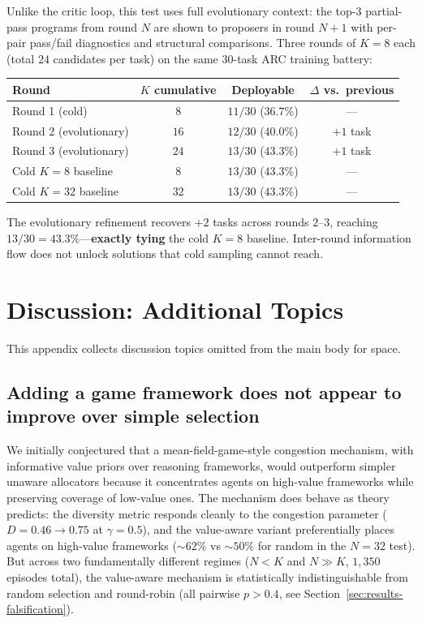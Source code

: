 \documentclass[11pt]{amsart}
\newcommand{\g}{\gamma}
\newcommand\1{{\mathds{1}}}
\theoremstyle{definition}
\theoremstyle{remark}
\numberwithin{equation}{section}
\begin{document}
Unlike the critic loop, this test uses full evolutionary context: the top-$3$ partial-pass programs from round $N$ are shown to proposers in round $N{+}1$ with per-pair pass/fail diagnostics and structural comparisons.
Three rounds of $K\!=\!8$ each (total $24$ candidates per task) on the same $30$-task ARC training battery:

\begin{center}\small
\begin{tabular}{lccc}
\toprule
Round & $K$ cumulative & Deployable & $\Delta$ vs.\ previous \\
\midrule
Round 1 (cold) & $8$ & $11/30$ ($36.7\%$) & --- \\
Round 2 (evolutionary) & $16$ & $12/30$ ($40.0\%$) & $+1$ task \\
Round 3 (evolutionary) & $24$ & $13/30$ ($43.3\%$) & $+1$ task \\
\midrule
Cold $K\!=\!8$ baseline & $8$ & $13/30$ ($43.3\%$) & --- \\
Cold $K\!=\!32$ baseline & $32$ & $13/30$ ($43.3\%$) & --- \\
\bottomrule
\end{tabular}
\end{center}

The evolutionary refinement recovers $+2$ tasks across rounds $2$--$3$, reaching $13/30 = 43.3\%$---\textbf{exactly tying} the cold $K\!=\!8$ baseline.
Inter-round information flow does not unlock solutions that cold sampling cannot reach.

\section{Discussion: Additional Topics}\label{app:discussion-extra}

This appendix collects discussion topics omitted from the main body for space.

\subsection{Adding a game framework does not appear to improve over simple selection}\label{app:game-remark}

We initially conjectured that a mean-field-game-style congestion mechanism, with informative value priors over reasoning frameworks, would outperform simpler unaware allocators because it concentrates agents on high-value frameworks while preserving coverage of low-value ones.
The mechanism does behave as theory predicts: the diversity metric responds cleanly to the congestion parameter ($D=0.46 \to 0.75$ at $\g\!=\!0.5$), and the value-aware variant preferentially places agents on high-value frameworks ($\sim 62\%$ vs $\sim 50\%$ for random in the $N\!=\!32$ test).
But across two fundamentally different regimes ($N\!<\!K$ and $N\!\gg\!K$, $1{,}350$ episodes total), the value-aware mechanism is statistically indistinguishable from random selection and round-robin (all pairwise $p > 0.4$, see Section~\ref{sec:results-falsification}).
\end{document}
